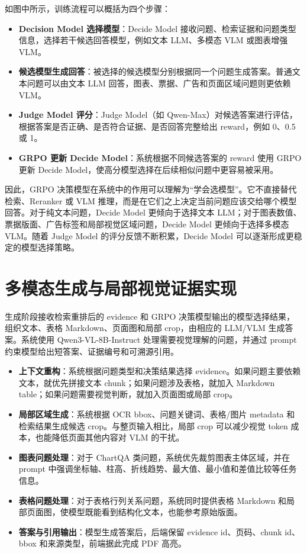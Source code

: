如图中所示，训练流程可以概括为四个步骤：

\begin{itemize}
  \item \textbf{Decision Model 选择模型}：Decide Model 接收问题、检索证据和问题类型信息，选择若干候选回答模型，例如文本 LLM、多模态 VLM 或图表增强 VLM。
  \item \textbf{候选模型生成回答}：被选择的候选模型分别根据同一个问题生成答案。普通文本问题可以由文本 LLM 回答，图表、票据、广告和页面区域问题则更依赖 VLM。
  \item \textbf{Judge Model 评分}：Judge Model（如 Qwen-Max）对候选答案进行评估，根据答案是否正确、是否符合证据、是否回答完整给出 reward，例如 0、0.5 或 1。
  \item \textbf{GRPO 更新 Decide Model}：系统根据不同候选答案的 reward 使用 GRPO 更新 Decide Model，使高分模型选择在后续相似问题中更容易被采用。
\end{itemize}

因此，GRPO 决策模型在系统中的作用可以理解为“学会选模型”。它不直接替代检索、Reranker 或 VLM 推理，而是在它们之上决定当前问题应该交给哪个模型回答。对于纯文本问题，Decide Model 更倾向于选择文本 LLM；对于图表数值、票据版面、广告标签和局部视觉区域问题，Decide Model 更倾向于选择多模态 VLM。随着 Judge Model 的评分反馈不断积累，Decide Model 可以逐渐形成更稳定的模型选择策略。

\section{多模态生成与局部视觉证据实现}

生成阶段接收检索重排后的 evidence 和 GRPO 决策模型输出的模型选择结果，组织文本、表格 Markdown、页面图和局部 crop，由相应的 LLM/VLM 生成答案。系统使用 Qwen3-VL-8B-Instruct 处理需要视觉理解的问题，并通过 prompt 约束模型给出短答案、证据编号和可溯源引用。

\begin{itemize}
  \item \textbf{上下文重构}：系统根据问题类型和决策结果选择 evidence。如果问题主要依赖文本，就优先拼接文本 chunk；如果问题涉及表格，就加入 Markdown table；如果问题需要视觉判断，就加入页面图或局部 crop。
  \item \textbf{局部区域生成}：系统根据 OCR bbox、问题关键词、表格/图片 metadata 和检索结果生成候选 crop。与整页输入相比，局部 crop 可以减少视觉 token 成本，也能降低页面其他内容对 VLM 的干扰。
  \item \textbf{图表问题处理}：对于 ChartQA 类问题，系统优先裁剪图表主体区域，并在 prompt 中强调坐标轴、柱高、折线趋势、最大值、最小值和差值比较等任务信息。
  \item \textbf{表格问题处理}：对于表格行列关系问题，系统同时提供表格 Markdown 和局部页面图，使模型既能看到结构化文本，也能参考原始版面。
  \item \textbf{答案与引用输出}：模型生成答案后，后端保留 evidence id、页码、chunk id、bbox 和来源类型，前端据此完成 PDF 高亮。
\end{itemize}


